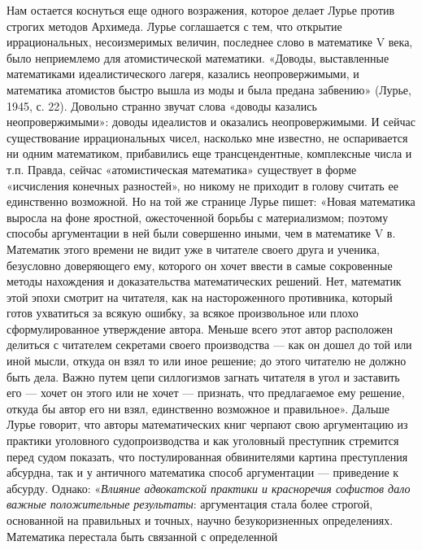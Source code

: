 Нам  остается коснуться  еще одного  возражения, которое  делает Лурье
против  строгих  методов  Архимеда.   Лурье  соглашается  с  тем,  что
открытие  иррациональных,  несоизмеримых  величин, последнее  слово  в
математике  V века,  было неприемлемо  для атомистической  математики.
«Доводы, выставленные  математиками идеалистического  лагеря, казались
неопровержимыми,  и  математика  атомистов  быстро  вышла  из  моды  и
была  предана  забвению»  (Лурье,   1945,  с.  22).  Довольно  странно
звучат  слова  «доводы  казались неопровержимыми»:  доводы  идеалистов
и  оказались неопровержимыми.  И  сейчас существование  иррациональных
чисел, насколько  мне известно, не оспаривается  ни одним математиком,
прибавились  еще трансцендентные,  комплексные  числа  и т.п.  Правда,
сейчас  «атомистическая  математика»  существует в  форме  «исчисления
конечных  разностей»,   но  никому   не  приходит  в   голову  считать
ее  единственно  возможной.  Но  на   той  же  странице  Лурье  пишет:
«Новая  математика выросла  на  фоне яростной,  ожесточенной борьбы  с
материализмом;  поэтому способы  аргументации  в  ней были  совершенно
иными, чем  в математике V в.  Математик этого времени не  видит уже в
читателе своего друга и  ученика, безусловно доверяющего ему, которого
он хочет ввести в самые сокровенные методы нахождения и доказательства
математических решений. Нет, математик этой эпохи смотрит на читателя,
как на  настороженного противника, который готов  ухватиться за всякую
ошибку, за всякое произвольное  или плохо сформулированное утверждение
автора.  Меньше  всего  этот  автор расположен  делиться  с  читателем
секретами своего производства --- как он  дошел до той или иной мысли,
откуда он взял  то или иное решение; до этого  читателю не должно быть
дела. Важно путем цепи силлогизмов загнать читателя в угол и заставить
его --- хочет он этого или не хочет --- признать, что предлагаемое ему
решение,  откуда  бы  автор  его  ни  взял,  единственно  возможное  и
правильное».  Дальше Лурье  говорит,  что  авторы математических  книг
черпают  свою  аргументацию  из практики  уголовного  судопроизводства
и  как  уголовный  преступник  стремится  перед  судом  показать,  что
постулированная обвинителями  картина преступления  абсурдна, так  и у
античного  математика способ  аргументации ---  приведение к  абсурду.
Однако:  «\emph{Влияние адвокатской  практики  и красноречия  софистов
дало  важные  положительные   результаты}:  аргументация  стала  более
строгой,  основанной на  правильных и  точных, научно  безукоризненных
определениях.  Математика  перестала  быть  связанной  с  определенной

